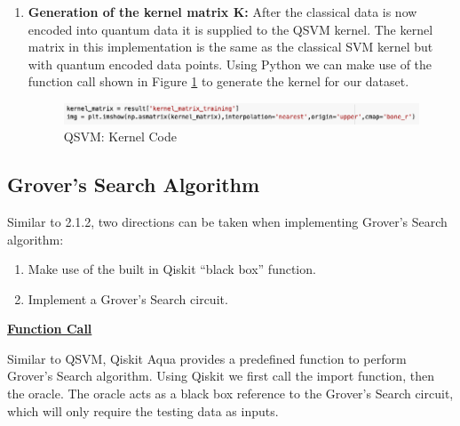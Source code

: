 \begin{enumerate}
\item \textbf{Generation of the kernel matrix K:} After the classical data is now encoded into  quantum data it is supplied to the QSVM kernel. The kernel matrix in this implementation is the same as the classical SVM kernel but with quantum encoded data points. Using Python we can  make use of the function call shown in Figure \ref{SVMKer} to generate the kernel for our dataset.

\begin{figure}[H]
      \centering
      \includegraphics[scale=0.5]{background/Kernal.png}
      \caption{QSVM: Kernel Code} %
      \label{SVMKer}
\end{figure}
\end{enumerate}




\subsection{Grover's Search Algorithm}

Similar to 2.1.2, two directions can be taken when implementing Grover's Search algorithm:
\begin{enumerate}

\item Make use of the built in Qiskit “black box” function.

\item Implement a Grover's Search circuit.
\end{enumerate}

\vspace{0.3cm}
\textbf{\underline{Function Call}}


Similar to QSVM, Qiskit Aqua provides a predefined function to perform Grover's Search algorithm. Using Qiskit we first call the import function, then the oracle. The oracle acts as a black box reference to the Grover's Search circuit, which will only require the testing data as inputs. 


